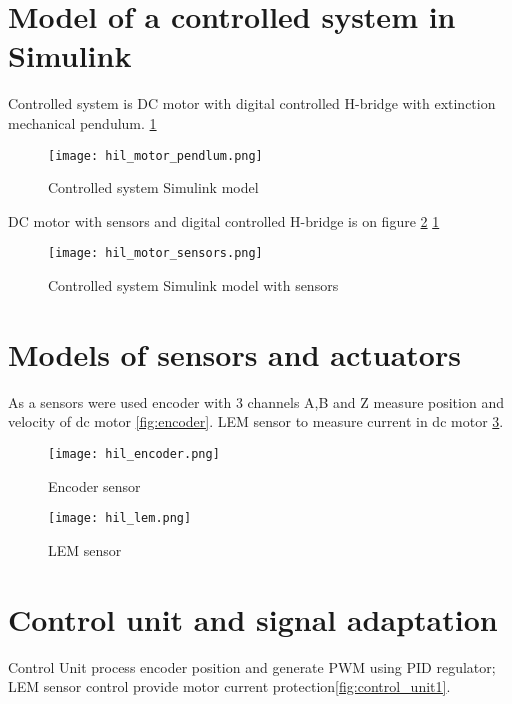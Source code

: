 \section{Model of a controlled system in Simulink}
Controlled system is DC motor with digital controlled H-bridge
with extinction mechanical pendulum.
\ref{fig:controlled_system}
\begin{figure}[htb!]
    \centering
    \texttt{[image: hil\_motor\_pendlum.png]}
\caption{Controlled system Simulink model}
    \label{fig:controlled_system}
\end{figure}

DC motor with sensors and digital controlled H-bridge is on figure
\ref{fig:motor_sensors}
\ref{fig:controlled_system}
\begin{figure}[htb!]
    \centering
    \texttt{[image: hil\_motor\_sensors.png]}
\caption{Controlled system Simulink model with sensors}
\label{fig:motor_sensors}
\end{figure}


\section{Models of sensors and actuators}
As a sensors were used encoder with 3 channels A,B and Z measure position
and velocity of dc motor \ref{fig:encoder}. LEM sensor to measure current in dc motor
\ref{fig:lem}.

\begin{figure}[hbt!]
    \centering
    \begin{minipage}{.5\textwidth}
    \centering
    \texttt{[image: hil\_encoder.png]}
    \caption{Encoder sensor}
    \label{fig:encoder}
\end{minipage}%
\begin{minipage}{.5\textwidth}
    \centering
    \texttt{[image: hil\_lem.png]}
    \caption{LEM sensor}
    \label{fig:lem}
\end{minipage}
\end{figure}

\section{Control unit and signal adaptation}
Control Unit process encoder position and generate PWM using PID regulator;
LEM sensor control provide motor current protection\ref{fig:control_unit1}.





